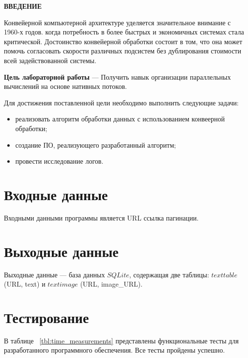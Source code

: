 \begin{center}
    \textbf{ВВЕДЕНИЕ}
\end{center}

Конвейерной компьютерной архитектуре уделяется значительное внимание с 1960-х годов.
когда потребность в более быстрых и экономичных системах стала критической.
Достоинство конвейерной обработки состоит в том, что она может помочь согласовать скорости различных подсистем без дублирования стоимости всей задействованной системы.

\textbf{Цель лабораторной работы} --- Получить навык организации параллельных
вычислений на основе нативных потоков.

Для достижения поставленной цели необходимо выполнить следующие задачи:
\begin{itemize}
    \item реализовать алгоритм обработки данных с использованием конвеерной обработки;
    \item создание ПО, реализующего разработанный алгоритм;
    \item провести исследование логов.
\end{itemize}


\section{Входные данные}
Входными данными программы является URL ссылка пагинации.


\section{Выходные данные}
Выходные данные --- база данных $SQLite$, содержащая две таблицы:  $texttable$
(URL, text) и 
$textimage$ (URL, image\_URL).

\clearpage

\section{Тестирование}
В таблице ~\ref{tbl:time_measurements} представлены функциональные тесты для разработанного
программного обеспечения. Все тесты пройдены успешно.

